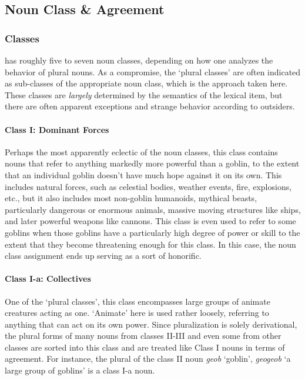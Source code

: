 \documentclass[a4paper,11pt,oneside,openany]{memoir}
\begin{document}
\subsection{Noun Class \& Agreement}

\subsubsection{Classes}

\lang{} has roughly five to seven noun classes, depending on how one analyzes the behavior of plural nouns. As a compromise, the `plural classes' are often indicated as sub-classes of the appropriate noun class, which is the approach taken here. These classes are \emph{largely} determined by the semantics of the lexical item, but there are often apparent exceptions and strange behavior according to outsiders.

\paragraph{Class I: Dominant Forces}

Perhaps the most apparently eclectic of the \lang{} noun classes, this class contains nouns that refer to anything markedly more powerful than a goblin, to the extent that an individual goblin doesn't have much hope against it on its own. This includes natural forces, such as celestial bodies, weather events, fire, explosions, etc., but it also includes most non-goblin humanoids, mythical beasts, particularly dangerous or enormous animals, massive moving structures like ships, and later powerful weapons like cannons. This class is even used to refer to some goblins when those goblins have a particularly high degree of power or skill to the extent that they become threatening enough for this class. In this case, the noun class assignment ends up serving as a sort of honorific.

\paragraph{Class I-a: Collectives}

One of the `plural classes', this class encompasses large groups of animate creatures acting as one. `Animate' here is used rather loosely, referring to anything that can act on its own power. Since \lang{} pluralization is solely derivational, the plural forms of many nouns from classes II-III and even some from other classes are sorted into this class and are treated like Class I nouns in terms of agreement. For instance, the plural of the class II noun \emph{geob} `goblin', \emph{geogeob} `a large group of goblins' is a class I-a noun.
\end{document}
